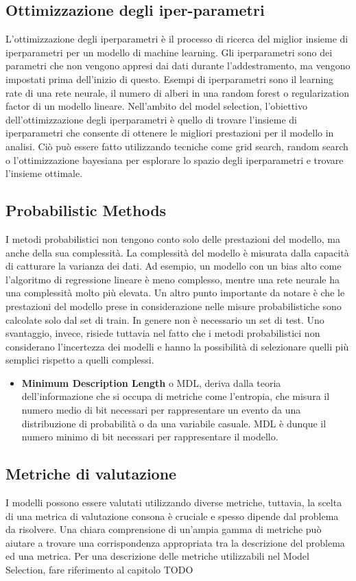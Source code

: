 \subsection{Ottimizzazione degli iper-parametri}
L'ottimizzazione degli iperparametri è il processo di ricerca del miglior insieme di iperparametri per un modello di machine learning. Gli iperparametri sono dei parametri che non vengono appresi dai dati durante l'addestramento, ma vengono impostati prima dell'inizio di questo. Esempi di iperparametri sono il learning rate di una rete neurale, il numero di alberi in una random forest o regularization factor di un modello lineare. Nell'ambito del model selection, l'obiettivo dell'ottimizzazione degli iperparametri è quello di trovare l'insieme di iperparametri che consente di ottenere le migliori prestazioni per il modello in analisi. Ciò può essere fatto utilizzando tecniche come grid search, random search o l'ottimizzazione bayesiana per esplorare lo spazio degli iperparametri e trovare l'insieme ottimale.


\subsection{Probabilistic Methods}
I metodi probabilistici non tengono conto solo delle prestazioni del modello, ma anche della sua complessità. La complessità del modello è misurata dalla capacità di catturare la varianza dei dati. 
Ad esempio, un modello con un bias alto come l'algoritmo di regressione lineare è meno complesso, mentre una rete neurale ha una complessità molto più elevata.
Un altro punto importante da notare è che le prestazioni del modello prese in considerazione nelle misure probabilistiche sono calcolate solo dal set di train. In genere non è necessario un set di test.
Uno svantaggio, invece, risiede tuttavia nel fatto che i metodi probabilistici non considerano l'incertezza dei modelli e hanno la possibilità di selezionare  quelli più semplici rispetto a quelli complessi.
\begin{itemize}
	\item \textbf{Minimum Description Length} o MDL, deriva dalla teoria dell'informazione che si occupa di metriche come l'entropia, che misura il numero medio di bit necessari per rappresentare un evento da una distribuzione di probabilità o da una variabile casuale. 
	      MDL è dunque il numero minimo di bit necessari per rappresentare il modello.
\end{itemize}

\subsection{Metriche di valutazione}
I modelli possono essere valutati utilizzando diverse metriche, tuttavia, la scelta di una metrica di valutazione consona è cruciale e spesso dipende dal problema da risolvere. Una chiara comprensione di un'ampia gamma di metriche può aiutare a trovare una corrispondenza appropriata tra la descrizione del problema ed una metrica.
Per una descrizione delle metriche utilizzabili nel Model Selection, fare riferimento al capitolo TODO

